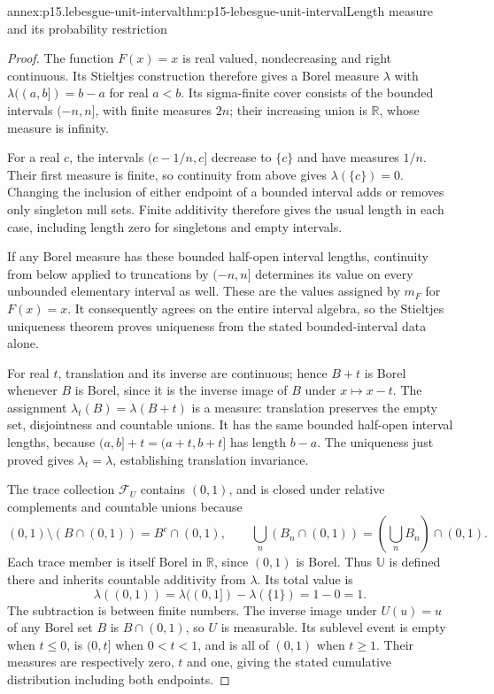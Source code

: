 \begin{annexitem}{annex:p15.lebesgue-unit-interval}{thm:p15-lebesgue-unit-interval}{Length measure and its probability restriction}
\begin{proof}
The function \(F(x)=x\) is real valued, nondecreasing and right
continuous. Its Stieltjes construction therefore gives a Borel measure
\(\lambda\) with \(\lambda((a,b])=b-a\) for real \(a<b\).
Its sigma-finite cover consists of the bounded intervals \((-n,n]\),
with finite measures \(2n\); their increasing union is \(\mathbb R\),
whose measure is infinity.

For a real \(c\), the intervals \((c-1/n,c]\) decrease to
\(\{c\}\) and have measures \(1/n\). Their first measure is
finite, so continuity from above gives \(\lambda(\{c\})=0\).
Changing the inclusion of either endpoint of a bounded interval adds
or removes only singleton null sets. Finite additivity therefore gives
the usual length in each case, including length zero for singletons
and empty intervals.

If any Borel measure has these bounded half-open interval lengths,
continuity from below applied to truncations by \((-n,n]\) determines
its value on every unbounded elementary interval as well. These are
the values assigned by \(m_F\) for \(F(x)=x\). It consequently
agrees on the entire interval algebra, so the Stieltjes uniqueness
theorem proves uniqueness from the stated bounded-interval data alone.

For real \(t\), translation and its inverse are continuous; hence
\(B+t\) is Borel whenever \(B\) is Borel, since it is the inverse
image of \(B\) under \(x\mapsto x-t\). The assignment
\(\lambda_t(B)=\lambda(B+t)\) is a measure: translation preserves
the empty set, disjointness and countable unions. It has the same
bounded half-open interval lengths, because
\((a,b]+t=(a+t,b+t]\) has length \(b-a\). The uniqueness just
proved gives \(\lambda_t=\lambda\), establishing translation
invariance.

The trace collection \(\mathcal F_U\) contains \((0,1)\), and is
closed under relative complements and countable unions because
\[
 (0,1)\setminus(B\cap(0,1))=B^c\cap(0,1),\qquad
 \bigcup_n(B_n\cap(0,1))=\left(\bigcup_nB_n\right)\cap(0,1).
\]
Each trace member is itself Borel in \(\mathbb R\), since \((0,1)\)
is Borel. Thus \(\mathbb U\) is defined there and inherits countable
additivity from \(\lambda\). Its total value is
\[
 \lambda((0,1))=\lambda((0,1])-\lambda(\{1\})=1-0=1.
\]
The subtraction is between finite numbers. The inverse image under
\(U(u)=u\) of any Borel set \(B\) is \(B\cap(0,1)\), so
\(U\) is measurable. Its sublevel event is empty when \(t\leq0\),
is \((0,t]\) when \(0<t<1\), and is all of \((0,1)\) when
\(t\geq1\). Their measures are respectively zero, \(t\) and one,
giving the stated cumulative distribution including both endpoints.
\end{proof}
\end{annexitem}

